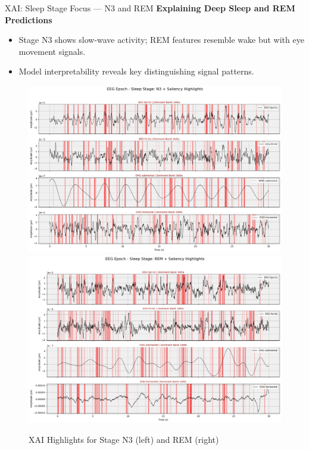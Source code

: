 \begin{frame}{XAI: Sleep Stage Focus — N3 and REM}
	\textbf{Explaining Deep Sleep and REM Predictions}
	\vspace{0.3cm}
	
	\begin{itemize}
		\item Stage N3 shows slow-wave activity; REM features resemble wake but with eye movement signals.
		\item Model interpretability reveals key distinguishing signal patterns.
	\end{itemize}
	
	\begin{figure}
		\centering
		\includegraphics[width=0.45\linewidth]{images/paper_3/stagen3.png}
		\includegraphics[width=0.45\linewidth]{images/paper_3/stagerem.png}
		\caption{XAI Highlights for Stage N3 (left) and REM (right)}
	\end{figure}
\end{frame}

